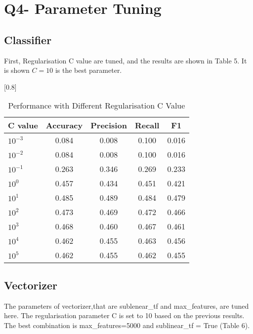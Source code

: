 \documentclass[a4paper,11pt]{article}
\begin{document}
\section{Q4- Parameter Tuning}
\subsection{Classifier}
First, Regularisation C value are tuned, and the results are shown in Table 5.
It is shown $C=10$ is the best parameter.%

\begin{table}[htbp]
    \centering
    \caption{Performance with Different Regularisation C Value}
    \small
    \scalebox{0.8}[0.8]{
    \begin{tabular}{l|cccc}
        C value & Accuracy & Precision & Recall & F1 \\ \hline 
        $10^{-3}$ &0.084 & 0.008& 0.100& 0.016\\ 
        $10^{-2}$ &0.084 &0.008 &0.100 &0.016\\ 
        $10^{-1}$ &0.263 &0.346 &0.269 &0.233\\ 
        $10^{0}$  &0.457 &0.434 &0.451 &0.421\\ 
        \rowcolor[rgb]{0.9,0.9,0}$10^{1}$  &0.485 &0.489 &0.484 &0.479\\ 
        $10^{2}$  &0.473 &0.469 &0.472 &0.466\\ 
        $10^{3}$  &0.468 &0.460 &0.467 &0.461\\ 
        $10^{4}$  &0.462 &0.455 &0.463 &0.456\\ 
        $10^{5}$  &0.462 &0.455 &0.462 &0.455\\ 

    \end{tabular}
    }
\end{table}
\subsection{Vectorizer}
The parameters of vectorizer,that are sublenear\_tf and max\_features, are tuned here.
The regularisation parameter C is set to 10 based on the previous results.
The best combination is max\_features=5000 and  sublinear\_tf = True (Table 6). 
\end{document}
